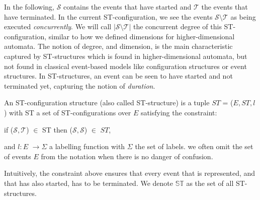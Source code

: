     In the following, $\mathcal{S}$ contains the events that have started and $\mathcal{T}$ the events that have terminated. In the current ST-configuration, we see the events $\mathcal{S} \setminus \mathcal{T}$ as being executed \emph{concurrently}. We will call $| \mathcal{S} \setminus \mathcal{T} |$ the concurrent degree of this ST-configuration, similar to how we defined dimensions for higher-dimensional automata. The notion of degree, and dimension, is the main characteristic captured by ST-structures which is found in higher-dimensional automata, but not found in classical event-based models like configuration structures or event structures. In ST-structures, an event can be seen to have started and not terminated yet, capturing the notion of \emph{duration}.
    
    \begin{definition}
        \label{def:st-structures}
        An ST-configuration structure (also called ST-structure) is a tuple $ST$ = ($E, ST, l$) with ST a set of ST-configurations over $E$ satisfying the constraint:
        
        \begin{center}
            if ($\mathcal{S},\mathcal{T}$) $\in$ ST then ($\mathcal{S},\mathcal{S}$) $\in$ $ST$,
        \end{center}
    
    and $l:E$ $\rightarrow \Sigma$ a labelling function with $\Sigma$ the set of labels. we often omit the set of events $E$ from the notation when there is no danger of confusion.
    \end{definition}
    
    Intuitively, the constraint above ensures that every event that is represented, and that has also started, has to be terminated. We denote $\mathbb{S} \mathbb{T}$ as the set of all ST-structures.
    
